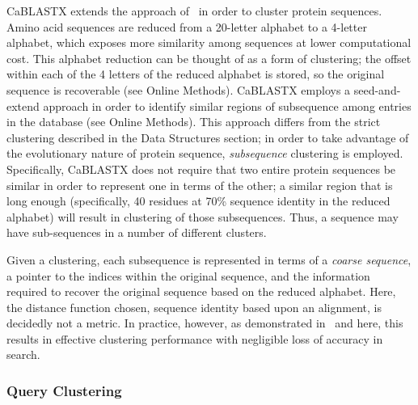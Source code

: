 \documentclass[review,preprint,12pt]{elsarticle}
\renewcommand{\cite}{\citep} %
\theoremstyle{definition}
\theoremstyle{remark}
\numberwithin{equation}{section}
\begin{document}
CaBLASTX extends the approach of~\cite{Daniels:2013} in order to cluster 
protein sequences.
Amino acid sequences are reduced from a 20-letter alphabet to a 4-letter
alphabet, which exposes more similarity among sequences at lower computational
cost.
This alphabet reduction can be thought of as a form of clustering; the offset 
within each of the 4 letters of the reduced alphabet is stored, so the original
sequence is recoverable (see Online Methods).
CaBLASTX employs a seed-and-extend approach in order to identify similar regions
of subsequence among entries in the database (see Online Methods).
This approach differs from the strict clustering described in the Data 
Structures section; in order to take advantage of the evolutionary nature of
protein sequence, \emph{subsequence} clustering is employed.
Specifically, CaBLASTX does not require that two entire protein sequences be 
similar in order to represent one in terms of the other; a similar region that 
is long enough (specifically, 40 residues at 70\% sequence identity in the 
reduced alphabet) will result in clustering of those subsequences. 
Thus, a sequence may have sub-sequences in a number of different clusters.

Given a clustering, each subsequence is represented in terms of a 
\emph{coarse sequence}, a pointer to the indices within the original sequence,
and the information required to recover the original sequence based on the
reduced alphabet.
Here, the distance function chosen, sequence identity based upon an alignment,
is decidedly not a metric.
In practice, however, as demonstrated in~\cite{Daniels:2013} and here, this
results in effective clustering performance with negligible loss of accuracy
in search.

\subsubsection{Query Clustering}
\end{document}
